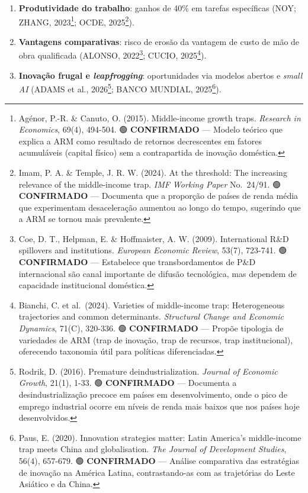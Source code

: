 \documentclass[
  brazilian,
  12pt,
]{article}
\providecommand{\tightlist}{%
  \setlength{\itemsep}{0pt}\setlength{\parskip}{0pt}}
\begin{document}
\begin{enumerate}
\def\labelenumi{\arabic{enumi}.}
\tightlist
\item
  \textbf{Produtividade do trabalho}: ganhos de 40\% em tarefas específicas (NOY; ZHANG, 2023\footnote{Agénor, P.-R. \& Canuto, O. (2015). Middle-income growth traps. \emph{Research in Economics}, 69(4), 494-504. 🟢 \textbf{CONFIRMADO} --- Modelo teórico que explica a ARM como resultado de retornos decrescentes em fatores acumuláveis (capital físico) sem a contrapartida de inovação doméstica.}; OCDE, 2025\footnote{Imam, P. A. \& Temple, J. R. W. (2024). At the threshold: The increasing relevance of the middle-income trap. \emph{IMF Working Paper} No.~24/91. 🟢 \textbf{CONFIRMADO} --- Documenta que a proporção de países de renda média que experimentam desaceleração aumentou ao longo do tempo, sugerindo que a ARM se tornou mais prevalente.}).
\item
  \textbf{Vantagens comparativas}: risco de erosão da vantagem de custo de mão de obra qualificada (ALONSO, 2022\footnote{Coe, D. T., Helpman, E. \& Hoffmaister, A. W. (2009). International R\&D spillovers and institutions. \emph{European Economic Review}, 53(7), 723-741. 🟢 \textbf{CONFIRMADO} --- Estabelece que transbordamentos de P\&D internacional são canal importante de difusão tecnológica, mas dependem de capacidade institucional doméstica.}; CUCIO, 2025\footnote{Bianchi, C. et al.~(2024). Varieties of middle-income trap: Heterogeneous trajectories and common determinants. \emph{Structural Change and Economic Dynamics}, 71(C), 320-336. 🟢 \textbf{CONFIRMADO} --- Propõe tipologia de variedades de ARM (trap de inovação, trap de recursos, trap institucional), oferecendo taxonomia útil para políticas diferenciadas.}).
\item
  \textbf{Inovação frugal e \emph{leapfrogging}}: oportunidades via modelos abertos e \emph{small AI} (ADAMS et al., 2026\footnote{Rodrik, D. (2016). Premature deindustrialization. \emph{Journal of Economic Growth}, 21(1), 1-33. 🟢 \textbf{CONFIRMADO} --- Documenta a desindustrialização precoce em países em desenvolvimento, onde o pico de emprego industrial ocorre em níveis de renda mais baixos que nos países hoje desenvolvidos.}; BANCO MUNDIAL, 2025\footnote{Paus, E. (2020). Innovation strategies matter: Latin America's middle-income trap meets China and globalisation. \emph{The Journal of Development Studies}, 56(4), 657-679. 🟢 \textbf{CONFIRMADO} --- Análise comparativa das estratégias de inovação na América Latina, contrastando-as com as trajetórias do Leste Asiático e da China.}).

\end{enumerate}
\end{document}
